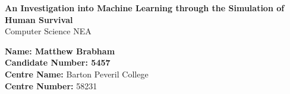 \documentclass{article}
\begin{document}
\begin{titlepage}
    \begin{center}
        \vspace*{3cm}
        {\Huge \textbf{An Investigation into Machine Learning through the Simulation of Human Survival}} \\
        \vspace{1cm}
        {\Large Computer Science NEA}
        
        \vfill
        
        \large
        \textbf{Name: Matthew Brabham} \\
        \textbf{Candidate Number: 5457} \\
        \vspace{0.2cm}
        \textbf{Centre Name:} Barton Peveril College\\
        \textbf{Centre Number:} 58231\\
        \pagebreak
    \end{center}
\end{titlepage}

\large

\setcounter{tocdepth}{5}
\tableofcontents










\end{document}
